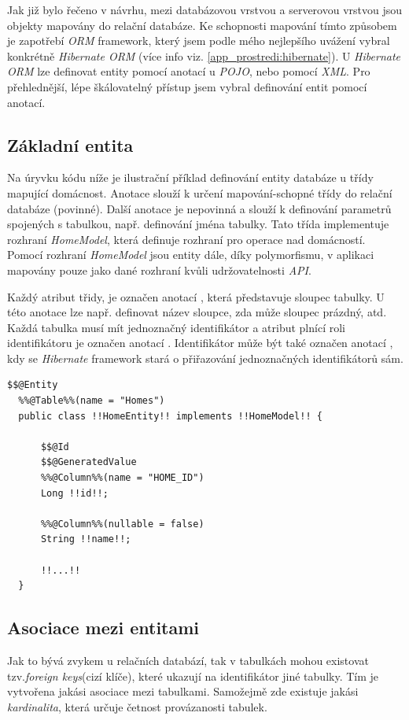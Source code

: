 Jak již bylo řečeno v návrhu, mezi databázovou vrstvou a serverovou vrstvou jsou objekty mapovány do relační databáze.
Ke schopnosti mapování tímto způsobem je zapotřebí \emph{ORM} framework, který jsem podle mého nejlepšího uvážení vybral konkrétně \emph{Hibernate ORM} (více info viz. \ref{app_prostredi:hibernate}).
U \emph{Hibernate ORM} lze definovat entity pomocí anotací u \emph{POJO}, nebo pomocí \emph{XML}.
Pro přehlednější, lépe škálovatelný přístup jsem vybral definování entit pomocí anotací.

\subsection*{Základní entita}

Na úryvku kódu níže je ilustrační příklad definování entity databáze u třídy mapující domácnost.
Anotace  slouží k určení mapování-schopné třídy do relační databáze (povinné).
Další anotace  je nepovinná a slouží k definování parametrů spojených s tabulkou, např. definování jména tabulky.
Tato třída implementuje rozhraní \emph{HomeModel}, která definuje rozhraní pro operace nad domácností.
Pomocí rozhraní \emph{HomeModel} jsou entity dále, díky polymorfismu, v aplikaci mapovány pouze jako dané rozhraní kvůli udržovatelnosti \emph{API}.

Každý atribut třidy, je označen anotací , která představuje sloupec tabulky.
U této anotace lze např. definovat název sloupce, zda může sloupec prázdný, atd.
Každá tabulka musí mít jednoznačný identifikátor a atribut plnící roli identifikátoru je označen anotací .
Identifikátor může být také označen anotací , kdy se \emph{Hibernate} framework stará o přiřazování jednoznačných identifikátorů sám.

\begin{lstlisting}[style=JavaStyle, caption={Ukázka definování entity}]
  $$@Entity
  %%@Table%%(name = "Homes")
  public class !!HomeEntity!! implements !!HomeModel!! {
  
      $$@Id
      $$@GeneratedValue
      %%@Column%%(name = "HOME_ID")
      Long !!id!!;
  
      %%@Column%%(nullable = false)
      String !!name!!;

      !!...!!
  }
\end{lstlisting}

\newpage
\subsection*{Asociace mezi entitami}
Jak to bývá zvykem u relačních databází, tak v tabulkách mohou existovat tzv.\emph{foreign keys}(cizí klíče), které ukazují na identifikátor jiné tabulky.
Tím je vytvořena jakási asociace mezi tabulkami.
Samožejmě zde existuje jakási \emph{kardinalita}, která určuje četnost provázanosti tabulek.

